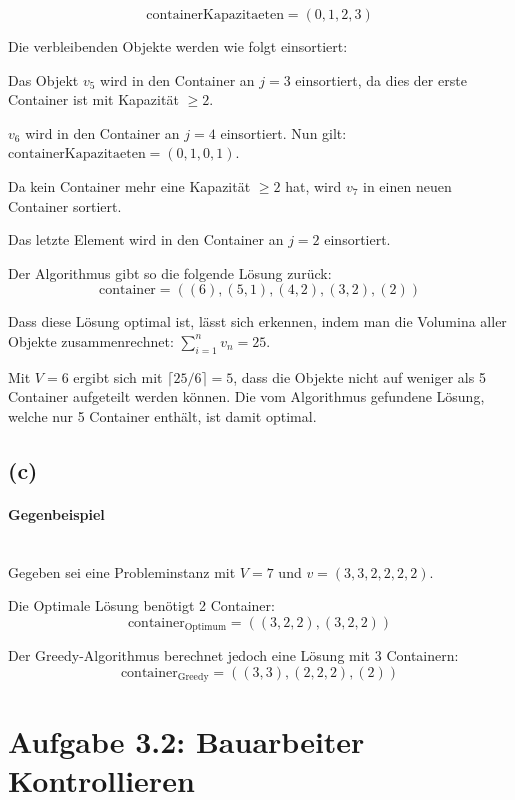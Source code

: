 \documentclass[a4paper,12pt]{article}
\begin{document}
$$\text{containerKapazitaeten}=(0,1,2,3)$$

Die verbleibenden Objekte werden wie folgt einsortiert:

Das Objekt $v_5$ wird in den Container an $j=3$ einsortiert, da dies der erste Container ist mit Kapazität $\geq 2$.

$v_6$ wird in den Container an $j=4$ einsortiert. Nun gilt: \\
$\text{containerKapazitaeten}=(0,1,0,1)$.

Da kein Container mehr eine Kapazität $\geq 2$ hat, wird $v_7$ in einen neuen Container sortiert.

Das letzte Element wird in den Container an $j=2$ einsortiert.


Der Algorithmus gibt so die folgende Lösung zurück:
$$\text{container}=((6),(5,1),(4,2),(3,2),(2))$$

Dass diese Lösung optimal ist, lässt sich erkennen, indem man die Volumina aller Objekte zusammenrechnet: $\sum\limits_{i=1}^nv_n=25$.

Mit $V=6$ ergibt sich mit $\lceil 25/6 \rceil = 5$, dass die Objekte nicht auf weniger als 5 Container aufgeteilt werden können. Die vom Algorithmus gefundene Lösung, welche nur 5 Container enthält, ist damit optimal.

\subsection*{(c)}
\paragraph*{Gegenbeispiel}\mbox{}\\
Gegeben sei eine Probleminstanz mit $V=7$ und $v=(3,3,2,2,2,2)$.

\noindent Die Optimale Lösung benötigt 2 Container:
$$\text{container}_\text{Optimum}=((3,2,2),(3,2,2))$$

\noindent Der Greedy-Algorithmus berechnet jedoch eine Lösung mit 3 Containern:
$$\text{container}_\text{Greedy}=((3,3),(2,2,2),(2))$$

\section*{Aufgabe 3.2: Bauarbeiter Kontrollieren}
\end{document}
